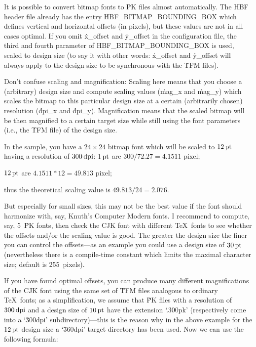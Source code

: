 \medskip

It is possible to convert bitmap fonts to \.{PK} files almost
automatically. The HBF header file already has the entry
\.{HBF\_BITMAP\_BOUNDING\_BOX} which defines vertical and horizontal offsets
(in pixels), but these values are not in all cases optimal. If you omit
\.{x\_offset} and \.{y\_offset} in the configuration file, the third and
fourth parameter of \.{HBF\_BITMAP\_BOUNDING\_BOX} is used, scaled to design
size (to say it with other words: \.{x\_offset} and \.{y\_offset} will always
apply to the design size to be synchronous with the \.{TFM} files).

Don't confuse scaling and magnification: Scaling here means that you choose
a (arbitrary) design size and compute scaling values (\.{mag\_x} and
\.{mag\_y}) which scales the bitmap to this particular design size at a
certain (arbitrarily chosen) resolution (\.{dpi\_x} and \.{dpi\_y}).
Magnification means that the scaled bitmap will be then magnified to a
certain target size while still using the font parameters (i.e., the
\.{TFM} file) of the design size.

In the sample, you have a $24 \times 24$ bitmap font which will be scaled to
$12\,\hbox{pt}$ having a resolution of $300\,\hbox{dpi}$:
\medskip
\quad $1\,\hbox{pt}$ are $300 / 72.27 = 4.1511$ pixel;

\quad $12\,\hbox{pt}$ are $4.1511 * 12 = 49.813$ pixel;

\quad thus the theoretical scaling value is $49.813 / 24 = 2.076$.

\medskip

But especially for small sizes, this may not be the best value if the font
should harmonize with, say, Knuth's Computer Modern fonts. I recommend to
compute, say, 5~\.{PK} fonts, then check the CJK font with different \TeX\
fonts to see whether the offsets and/or the scaling value is good. The
greater the design size the finer you can control the offsets---as an
example you could use a design size of $30\,\hbox{pt}$ (nevertheless there
is a compile-time constant \PB{\.{MAX\_CHAR\_SIZE}} which limits the maximal
character size; default is 255~pixels).

If you have found optimal offsets, you can produce many different
magnifications of the CJK font using the same set of \.{TFM} files
analogous to ordinary \TeX\ fonts; as a simplification, we assume that
\.{PK} files with a resolution of $300\,\hbox{dpi}$ and a design size of
$10\,\hbox{pt}$ have the extension `\.{.300pk}' (respectively come into a
`\.{300dpi}' subdirectory)---this is the reason why in the above example for
the $12\,\hbox{pt}$ design size a `\.{360dpi}' target directory has been
used. Now we can use the following formula:

